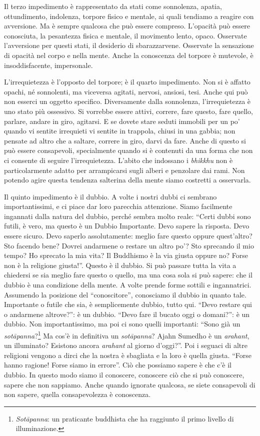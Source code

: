 Il terzo impedimento è rappresentato da stati come sonnolenza, apatia,
ottundimento, indolenza, torpore fisico e mentale, ai quali tendiamo a
reagire con avversione. Ma è sempre qualcosa che può essere compreso.
L'opacità può essere conosciuta, la pesantezza fisica e mentale, il
movimento lento, opaco. Osservate l'avversione per questi stati, il
desiderio di sbarazzarvene. Osservate la sensazione di opacità nel corpo
e nella mente. Anche la conoscenza del torpore è mutevole, è
insoddisfacente, impersonale.

L'irrequietezza è l'opposto del torpore; è il quarto impedimento. Non si
è affatto opachi, né sonnolenti, ma viceversa agitati, nervosi, ansiosi,
tesi. Anche qui può non esserci un oggetto specifico. Diversamente dalla
sonnolenza, l'irrequietezza è uno stato più ossessivo. Si vorrebbe
essere attivi, correre, fare questo, fare quello, parlare, andare in
giro, agitarsi. E se dovete stare seduti immobili per un po' quando vi
sentite irrequieti vi sentite in trappola, chiusi in una gabbia; non
pensate ad altro che a saltare, correre in giro, darvi da fare. Anche di
questo si può essere consapevoli, specialmente quando si è contenuti da
una forma che non ci consente di seguire l'irrequietezza. L'abito che
indossano i \textit{bhikkhu} non è particolarmente adatto per arrampicarsi sugli
alberi e penzolare dai rami. Non potendo agire questa tendenza salterina
della mente siamo costretti a osservarla.

Il quinto impedimento è il dubbio. A volte i nostri dubbi ci sembrano
importantissimi, e ci piace dar loro parecchia attenzione. Siamo
facilmente ingannati dalla natura del dubbio, perché sembra molto reale:
``Certi dubbi sono futili, è vero, ma questo è un Dubbio Importante. Devo
sapere la risposta. Devo essere sicuro. Devo saperlo assolutamente:
meglio fare questo oppure quest'altro? Sto facendo bene? Dovrei
andarmene o restare un altro po'? Sto sprecando il mio tempo? Ho
sprecato la mia vita? Il Buddhismo è la via giusta oppure no? Forse non
è la religione giusta!''. Questo è il dubbio. Si può passare tutta la
vita a chiedersi se sia meglio fare questo o quello, ma una cosa sola si
può sapere: che il dubbio è una condizione della mente. A volte prende
forme sottili e ingannatrici. Assumendo la posizione del ``conoscitore'',
conosciamo il dubbio in quanto tale. Importante o futile che sia, è
semplicemente dubbio, tutto qui. ``Devo restare qui o andarmene
altrove?'': è un dubbio. ``Devo fare il bucato oggi o domani?'': è un
dubbio. Non importantissimo, ma poi ci sono quelli importanti: ``Sono già
un \textit{sotāpanna}?\footnote{\textit{Sotāpanna}: un praticante buddhista che ha raggiunto il
primo livello di illuminazione.} Ma cos'è in definitiva un \textit{sotāpanna}? Ajahn
Sumedho è un \textit{arahant}, un illuminato? Esistono ancora \textit{arahant} al giorno
d'oggi?''. Poi i seguaci di altre religioni vengono a dirci che la nostra
è sbagliata e la loro è quella giusta. ``Forse hanno ragione! Forse siamo
in errore''. Ciò che possiamo sapere è che c'è il dubbio. In questo modo
siamo il conoscere, conoscere ciò che si può conoscere, sapere che non
sappiamo. Anche quando ignorate qualcosa, se siete consapevoli di non
sapere, quella consapevolezza è conoscenza.

